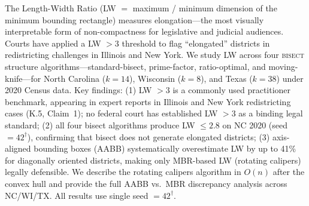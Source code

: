 The Length-Width Ratio (LW $=$ maximum / minimum dimension of the minimum
bounding rectangle) measures elongation---the most visually interpretable
form of non-compactness for legislative and judicial audiences.
Courts have applied a LW $> 3$ threshold to flag ``elongated'' districts in
redistricting challenges in Illinois and New York.
We study LW across four \textsc{bisect} structure algorithms---standard-bisect,
prime-factor, ratio-optimal, and moving-knife---for North Carolina ($k=14$),
Wisconsin ($k=8$), and Texas ($k=38$) under 2020 Census data.
Key findings: (1) LW $> 3$ is a commonly used practitioner benchmark, appearing in
expert reports in Illinois and New York redistricting cases (K.5, Claim~1);
no federal court has established LW $> 3$ as a binding legal standard;
(2) all four bisect algorithms produce LW $\leq 2.8$ on NC 2020
(seed $= 42^\dagger$), confirming that bisect does not generate elongated districts;
(3) axis-aligned bounding boxes (AABB) systematically overestimate LW by up to 41\%
for diagonally oriented districts, making only MBR-based LW (rotating calipers)
legally defensible.
We describe the rotating calipers algorithm in $O(n)$ after the convex hull
and provide the full AABB vs.\ MBR discrepancy analysis across NC/WI/TX.
All results use single seed $= 42^\dagger$.
